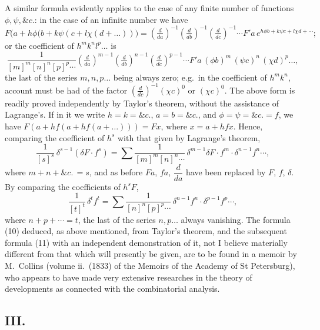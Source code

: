 \documentclass[11pt]{article}
\begin{document}
A similar formula evidently applies to the case of any finite number of functions $\phi,\psi,\&c.$: in the case of an infinite number we have
\begin{equation}
F\bigl(a + h\phi(b + k\psi(c + l\chi(d + \ldots))\bigr) = \left(\tfrac{d}{da}\right)^{-1}\!\!\left(\tfrac{d}{db}\right)^{-1}\!\!\left(\tfrac{d}{dc}\right)^{-1}\!\!\cdots F'a\, e^{h\phi b + k\psi c + l\chi d + \cdots};
\end{equation}
or the coefficient of $h^m k^n l^p \ldots$ is
\[ \frac{1}{[m]^m[n]^n[p]^p\cdots}\!\left(\tfrac{d}{da}\right)^{m-1}\!\!\left(\tfrac{d}{db}\right)^{n-1}\!\!\left(\tfrac{d}{dc}\right)^{p-1}\!\!\cdots F'a\,(\phi b)^m\,(\psi c)^n\,(\chi d)^p\ldots, \]
the last of the series $m,n,p\ldots$ being always zero; e.g.\ in the coefficient of $h^m k^n$, account must be had of the factor $\left(\tfrac{d}{dc}\right)^{-1}\!(\chi c)^0$ or $(\chi c)^0$. The above form is readily proved independently by Taylor's theorem, without the assistance of Lagrange's. If in it we write $h=k=\&c.$, $a=b=\&c.$, and $\phi=\psi=\&c.=f$, we have $F(a+hf(a+hf(a+\ldots)))=Fx$, where $x=a+hfx$. Hence, comparing the coefficient of $h^s$ with that given by Lagrange's theorem,
\begin{equation}
\frac{1}{[s]^s}\,\delta^{s-1}(\delta F\cdot f^s) = \sum\frac{1}{[m]^m[n]^n\cdots}\,\delta^{m-1}\!\delta F\cdot f^m\cdot \delta^{n-1}f^n\cdots,
\end{equation}
where $m + n + \&c.\, = s$, and as before $F a$, $f a$, $\dfrac{d}{da}$ have been replaced by $F$, $f$, $\delta$. By comparing the coefficients of $h^s F$,
\begin{equation}
\frac{1}{[t]^t}\,\delta^t f^t = \sum\frac{1}{[n]^n[p]^p\cdots}\,\delta^{n-1}f^n\cdot \delta^{p-1}f^p\cdots,
\end{equation}
where $n + p + \cdots = t$, the last of the series $n,p\ldots$ always vanishing. The formula (10) deduced, as above mentioned, from Taylor's theorem, and the subsequent formula (11) with an independent demonstration of it, not I believe materially different from that which will presently be given, are to be found in a memoir by M.\ Collins (volume ii.\ (1833) of the Memoirs of the Academy of St Petersburg), who appears to have made very extensive researches in the theory of developments as connected with the combinatorial analysis.

\subsection*{III.}
\end{document}
